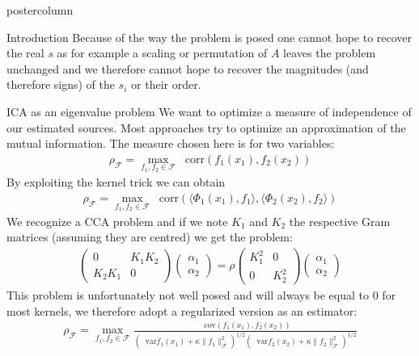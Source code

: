 \documentclass{beamer}
\newcommand*\cov{\mathop{}\!\mathrm{cov}}
\newcommand*\var{\mathop{}\!\mathrm{var}}
\newcommand*\corr{\mathop{}\!\mathrm{corr}}
\begin{document}
\begin{frame}
\begin{columns}
\begin{column}{.5\textwidth}
\begin{beamercolorbox}[center]{postercolumn}
\begin{minipage}{.98\textwidth}
{\begin{myblock}{Introduction}
						Because of the way the problem is posed one cannot hope to recover the real $s$ as for example a scaling or permutation of $A$ leaves the problem unchanged and we therefore cannot hope to recover the magnitudes (and therefore signs) of the $s_i$ or their order.
					\end{myblock}\vfill
					\begin{myblock}{ICA as an eigenvalue problem}
						We want to optimize a measure of independence of our estimated sources. Most approaches try to optimize an approximation of the mutual information. The measure chosen here \cite{Bach2002} is for two variables:
						\begin{align*}
							\rho_\mathcal{F} = \max_{f_1, f_2 \in \mathcal{F}} \corr (f_1(x_1), f_2 (x_2))
						\end{align*}
						By exploiting the kernel trick we can obtain
						\begin{align*}
							\rho_\mathcal{F} = \max_{f_1, f_2 \in \mathcal{F}} \corr ( \langle \Phi_1 (x_1), f_1 \rangle , \langle \Phi_2 (x_2), f_2 \rangle)
						\end{align*}
						We recognize a CCA problem and if we note $K_1$ and $K_2$ the respective Gram matrices (assuming they are centred) we get the problem:
						\begin{align*}
							\begin{pmatrix}
								0 & K_1 K_2 \\
								K_2 K_1 & 0
							\end{pmatrix} \begin{pmatrix}
								\alpha_1 \\ \alpha_2
							\end{pmatrix}
							= \rho \begin{pmatrix}
								K_1^2 & 0 \\
								0 & K_2^2
							\end{pmatrix} \begin{pmatrix}
								\alpha_1 \\ \alpha_2
							\end{pmatrix}
						\end{align*}
						This problem is unfortunately not well posed and will always be equal to $0$ for most kernels, we therefore adopt a regularized version as an estimator:
						\begin{align*}
							\rho_\mathcal{F} = \max_{f_1, f_2 \in \mathcal{F}} \frac{\cov (f_1(x_1), f_2 (x_2))}{(\var f_1 (x_1) + \kappa \lVert f_1 \rVert^2 _\mathcal{F} )^{1/2} (\var f_2 (x_2) + \kappa \lVert f_2 \rVert^2 _\mathcal{F} )^{1/2}}

\end{align*}
\end{myblock}}
\end{minipage}
\end{beamercolorbox}
\end{column}
\end{columns}
\end{frame}
\end{document}
